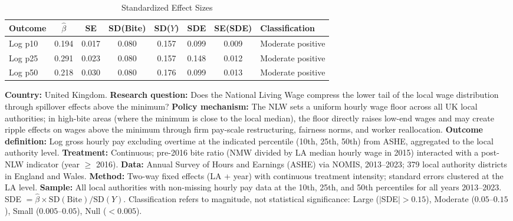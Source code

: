 \begin{table}[t]
\centering
\caption{Standardized Effect Sizes}
\label{tab:sde}
\small
\begin{tabular}{lccccccl}
\hline\hline
Outcome & $\hat{\beta}$ & SE & SD(Bite) & SD($Y$) & SDE & SE(SDE) & Classification \\
\hline
Log p10 & 0.194 & 0.017 & 0.080 & 0.157 & 0.099 & 0.009 & Moderate positive \\
Log p25 & 0.291 & 0.023 & 0.080 & 0.157 & 0.148 & 0.012 & Moderate positive \\
Log p50 & 0.218 & 0.030 & 0.080 & 0.176 & 0.099 & 0.013 & Moderate positive \\
\hline\hline
\end{tabular}
\parbox{\textwidth}{\raggedright\scriptsize
\textbf{Country:} United Kingdom.
\textbf{Research question:} Does the National Living Wage compress the lower tail of the local wage distribution through spillover effects above the minimum?
\textbf{Policy mechanism:} The NLW sets a uniform hourly wage floor across all UK local authorities; in high-bite areas (where the minimum is close to the local median), the floor directly raises low-end wages and may create ripple effects on wages above the minimum through firm pay-scale restructuring, fairness norms, and worker reallocation.
\textbf{Outcome definition:} Log gross hourly pay excluding overtime at the indicated percentile (10th, 25th, 50th) from ASHE, aggregated to the local authority level.
\textbf{Treatment:} Continuous; pre-2016 bite ratio (NMW divided by LA median hourly wage in 2015) interacted with a post-NLW indicator (year $\geq$ 2016).
\textbf{Data:} Annual Survey of Hours and Earnings (ASHE) via NOMIS, 2013--2023; 379 local authority districts in England and Wales.
\textbf{Method:} Two-way fixed effects (LA + year) with continuous treatment intensity; standard errors clustered at the LA level.
\textbf{Sample:} All local authorities with non-missing hourly pay data at the 10th, 25th, and 50th percentiles for all years 2013--2023.
SDE $= \hat{\beta} \times \text{SD}(\text{Bite}) / \text{SD}(Y)$. Classification refers to magnitude, not statistical significance: Large ($|$SDE$| > 0.15$), Moderate ($0.05$--$0.15$), Small ($0.005$--$0.05$), Null ($< 0.005$).
}
\end{table}
